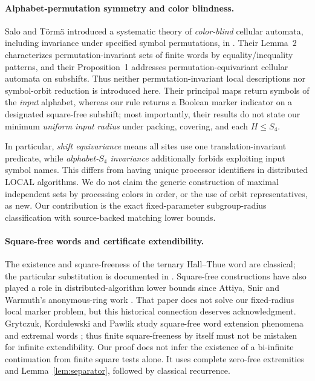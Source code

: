 \documentclass[11pt]{article}
\theoremstyle{remark}
\begin{document}
\paragraph{Alphabet-permutation symmetry and color blindness.}
Salo and T{\"o}rm{\"a} introduced a systematic
theory of \emph{color-blind} cellular automata,
including invariance under specified symbol
permutations, in \cite{salotorma2014colorblind}.
Their Lemma~2 characterizes permutation-invariant
sets of finite words by equality/inequality
patterns, and their Proposition~1 addresses
permutation-equivariant cellular automata on
subshifts. Thus neither permutation-invariant
local descriptions nor symbol-orbit reduction
is introduced here. Their principal maps return
symbols of the \emph{input} alphabet, whereas
our rule returns a Boolean marker indicator
on a designated square-free subshift; most
importantly, their results do not state our
minimum \emph{uniform input radius} under
packing, covering, and each $H\le S_4$.

In particular, \emph{shift equivariance} means
all sites use one translation-invariant predicate,
while \emph{alphabet-$S_4$ invariance}
additionally forbids exploiting input symbol names.
This differs from having unique processor
identifiers in distributed LOCAL algorithms.
We do not claim the generic construction of
maximal independent sets by processing colors
in order, or the use of orbit representatives,
as new. Our contribution is the exact
fixed-parameter subgroup-radius classification
with source-backed matching lower bounds.

\paragraph{Square-free words and certificate extendibility.}
The existence and square-freeness of the ternary
Hall--Thue word are classical; the particular
substitution is documented in
\cite{badkobeh2022avoiding}. Square-free
constructions have also played a role in
distributed-algorithm lower bounds since
Attiya, Snir and Warmuth's anonymous-ring
work \cite{attiya1988anonymous}. That paper
does not solve our fixed-radius local marker
problem, but this historical connection
deserves acknowledgment.
Grytczuk, Kordulewski and Pawlik study square-free word
extension phenomena and extremal words
\cite{grytczuk2021squarefree}; thus finite square-freeness
by itself must not be mistaken for infinite extendibility.
Our proof does not infer the existence of a bi-infinite
continuation from finite square tests alone. It uses complete zero-free extremities and
Lemma~\ref{lem:separator}, followed by classical recurrence.
\end{document}
